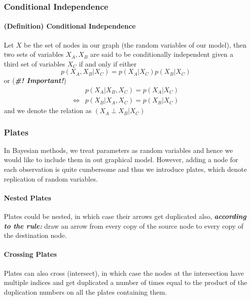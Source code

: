 \documentclass[11pt]{article}
\newcommand{\independent}{\perp}
\begin{document}
\subsubsection{Conditional Independence} 
\paragraph{(Definition) Conditional Independence} Let $X$ be the set of nodes in our graph (the random variables of our model), then two sets of variables $X_A, X_B$ are said to be conditionally independent given a third set of variables $X_C$ if and only if either
\begin{equation}
    p\left(X_{A}, X_{B} | X_{C}\right)=p\left(X_{A} | X_{C}\right) p\left(X_{B} | X_{C}\right)
\end{equation}
or (\textit{\textbf{\#! Important!}})
\begin{align}
    &p\left(X_{A} | X_{B}, X_{C}\right)=p\left(X_{A} | X_{C}\right) \\
    \iff &p\left(X_{B} | X_{A}, X_{C}\right)=p\left(X_{B} | X_{C}\right)
\end{align}
and we denote the relation as $\left(X_{A} \independent X_{B} | X_{C}\right)$

\subsubsection{Plates}
In Bayesian methods, we treat parameters as random variables and hence we would like to include them in out graphical model. However, adding a node for each observation is quite cumbersome and thus we introduce plates, which denote replication of random variables. 

\paragraph{Nested Plates}
Plates could be nested, in which case their arrows get duplicated also, \textit{\textbf{according to the rule:}} draw an arrow from every copy of the source node to every copy of the destination node.

\paragraph{Crossing Plates}
Plates can also cross (intersect), in which case the nodes at the intersection have multiple indices and get duplicated a number of times equal to the product of the duplication numbers on all the plates containing them.
\end{document}

